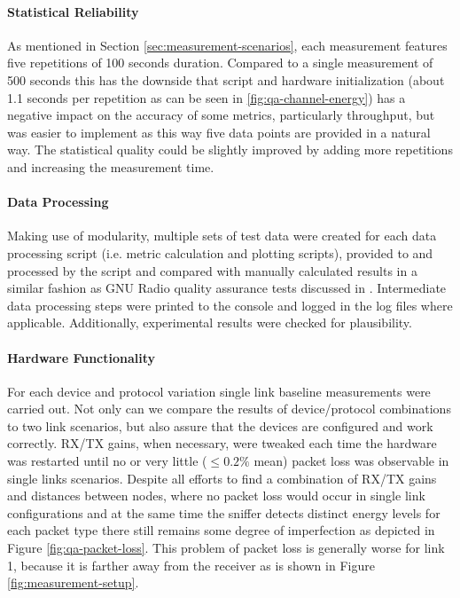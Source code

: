 \paragraph{Statistical Reliability}
As mentioned in Section \ref{sec:measurement-scenarios}, each measurement features five repetitions of 100 seconds duration. Compared to a single measurement of 500 seconds this has the downside that script and hardware initialization (about 1.1 seconds per repetition as can be seen in \ref{fig:qa-channel-energy}) has a negative impact on the accuracy of some metrics, particularly throughput, but was easier to implement as this way five data points are provided in a natural way. The statistical quality could be slightly improved by adding more repetitions and increasing the measurement time. 

\paragraph{Data Processing}
Making use of modularity, multiple sets of test data were created for each data processing script (i.e. metric calculation and plotting scripts), provided to and processed by the script and compared with manually calculated results in a similar fashion as GNU Radio quality assurance tests discussed in \cite{gr-python-tut}. Intermediate data processing steps were printed to the console and logged in the log files where applicable. Additionally, experimental results were checked for plausibility. 

\paragraph{Hardware Functionality}
For each device and protocol variation single link baseline measurements were carried out. Not only can we compare the results of device/protocol combinations to two link scenarios, but also assure that the devices are configured and work correctly. RX/TX gains, when necessary, were tweaked each time the hardware was restarted until no or very little ($\le0.2\%$ mean) packet loss was observable in single links scenarios.
Despite all efforts to find a combination of RX/TX gains and distances between nodes, where no packet loss would occur in single link configurations and at the same time the sniffer detects distinct energy levels for each packet type there still remains some degree of imperfection as depicted in Figure \ref{fig:qa-packet-loss}. This problem of packet loss is generally worse for link 1, because it is farther away from the receiver as is shown in Figure \ref{fig:measurement-setup}.  

